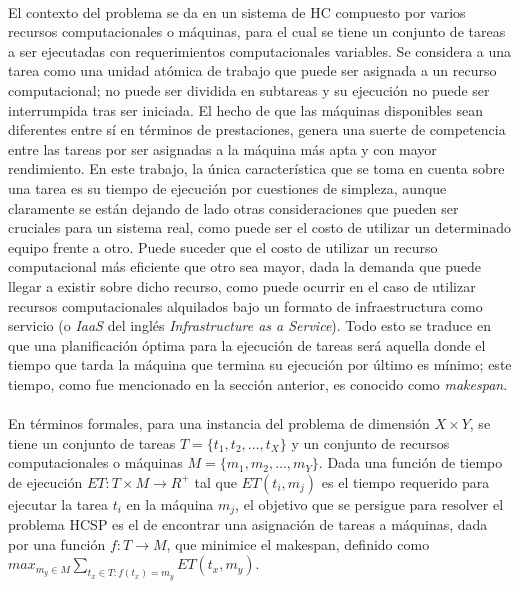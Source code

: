 \paragraph{}El contexto del problema se da en un sistema de HC compuesto por varios recursos computacionales o máquinas, para el cual se tiene un conjunto de tareas a ser ejecutadas con requerimientos computacionales variables.
Se considera a una tarea como una unidad atómica de trabajo que puede ser asignada a un recurso computacional; no puede ser dividida en subtareas y su ejecución no puede ser interrumpida tras ser iniciada.
El hecho de que las máquinas disponibles sean diferentes entre sí en términos de prestaciones, genera una suerte de competencia entre las tareas por ser asignadas a la máquina más apta y con mayor rendimiento.
En este trabajo, la única característica que se toma en cuenta sobre una tarea es su tiempo de ejecución por cuestiones de simpleza, aunque claramente se están dejando de lado otras consideraciones que pueden ser cruciales para un sistema real, como puede ser el costo de utilizar un determinado equipo frente a otro. 
Puede suceder que el costo de utilizar un recurso computacional más eficiente que otro sea mayor, dada la demanda que puede llegar a existir sobre dicho recurso, como puede ocurrir en el caso de utilizar recursos computacionales alquilados bajo un formato de infraestructura como servicio (o \textit{IaaS} del inglés \textit{Infrastructure as a Service}). 
Todo esto se traduce en que una planificación óptima para la ejecución de tareas será aquella donde el tiempo que tarda la máquina que termina su ejecución por último es mínimo; este tiempo, como fue mencionado en la sección anterior, es conocido como \textit{makespan}.

\paragraph{}En términos formales, para una instancia del problema de dimensión $X\times Y$, se tiene un conjunto de tareas $T = \{t_1,t_2,\dots,t_X\}$ y un conjunto de recursos computacionales o máquinas $M = \{m_1,m_2,\dots,m_Y \}$.
Dada una función de tiempo de ejecución $ET : T \times M \rightarrow R^+$ tal que $ET(t_i,m_j)$ es el tiempo requerido para ejecutar la tarea $t_i$ en la máquina $m_j$, el objetivo que se persigue para resolver el problema HCSP es el de encontrar una asignación de tareas a máquinas, dada por una función $f: T \rightarrow M$, que minimice el makespan, definido como $max_{m_y \in M} \sum_{t_x \in T: f(t_x)=m_y} ET(t_x, m_y)$.

